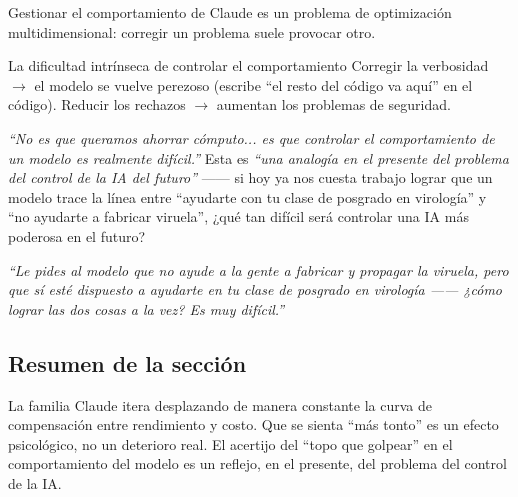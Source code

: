 Gestionar el comportamiento de Claude es un problema de optimización multidimensional: corregir un problema suele provocar otro.

\begin{knowledgebox}{La dificultad intrínseca de controlar el comportamiento}
Corregir la verbosidad $\to$ el modelo se vuelve perezoso (escribe ``el resto del código va aquí'' en el código). Reducir los rechazos $\to$ aumentan los problemas de seguridad.

\textit{``No es que queramos ahorrar cómputo... es que controlar el comportamiento de un modelo es realmente difícil.''} Esta es \textit{``una analogía en el presente del problema del control de la IA del futuro''} —— si hoy ya nos cuesta trabajo lograr que un modelo trace la línea entre ``ayudarte con tu clase de posgrado en virología'' y ``no ayudarte a fabricar viruela'', ¿qué tan difícil será controlar una IA más poderosa en el futuro?

\textit{``Le pides al modelo que no ayude a la gente a fabricar y propagar la viruela, pero que sí esté dispuesto a ayudarte en tu clase de posgrado en virología —— ¿cómo lograr las dos cosas a la vez? Es muy difícil.''}
\end{knowledgebox}

\subsection{Resumen de la sección}

La familia Claude itera desplazando de manera constante la curva de compensación entre rendimiento y costo. Que se sienta ``más tonto'' es un efecto psicológico, no un deterioro real. El acertijo del ``topo que golpear'' en el comportamiento del modelo es un reflejo, en el presente, del problema del control de la IA.
